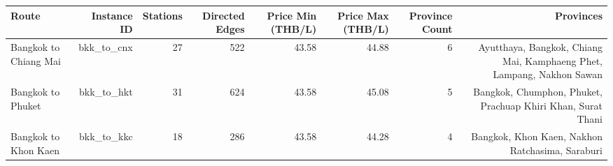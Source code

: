 \begin{tabular}{lrrrrrrr}
\hline
Route & Instance ID & Stations & Directed Edges & Price Min (THB/L) & Price Max (THB/L) & Province Count & Provinces \\
\hline
Bangkok to Chiang Mai & bkk\_to\_cnx & 27 & 522 & 43.58 & 44.88 & 6 & Ayutthaya, Bangkok, Chiang Mai, Kamphaeng Phet, Lampang, Nakhon Sawan \\
Bangkok to Phuket & bkk\_to\_hkt & 31 & 624 & 43.58 & 45.08 & 5 & Bangkok, Chumphon, Phuket, Prachuap Khiri Khan, Surat Thani \\
Bangkok to Khon Kaen & bkk\_to\_kkc & 18 & 286 & 43.58 & 44.28 & 4 & Bangkok, Khon Kaen, Nakhon Ratchasima, Saraburi \\
\hline
\end{tabular}
